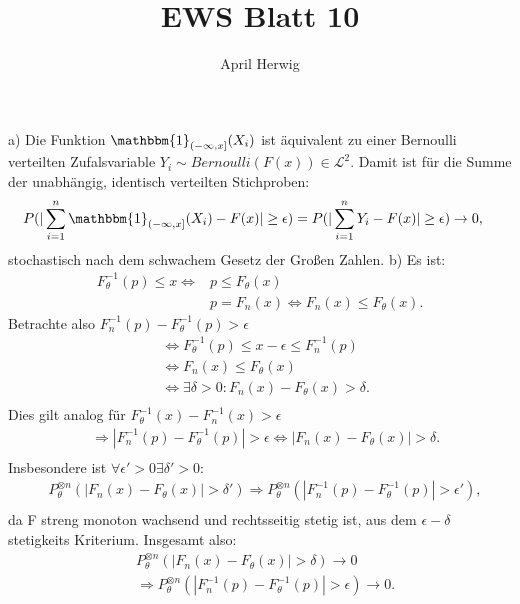 \documentclass[draft]{article}
\title{EWS Blatt 10}
\author{April Herwig}
\begin{document}
\maketitle

a) Die Funktion $\mathbbm{1}_{(-\infty, x]} (X_i)$ ist äquivalent zu einer Bernoulli verteilten Zufalsvariable $Y_i \sim Bernoulli(F(x)) \in \mathcal{L}^2$. Damit ist für die Summe der unabhängig, identisch verteilten Stichproben: 
\begin{align*}
    &P(|\sum\limits_{i=1}^{n}\mathbbm{1}_{(-\infty, x]} (X_i)-F(x)|\geq\epsilon) = P(|\sum\limits_{i=1}^{n} Y_i-F(x)|\geq\epsilon) \rightarrow 0,
\end{align*}
stochastisch nach dem schwachem Gesetz der Großen Zahlen.
\newline
\newline
\newline
b) Es ist: 
\begin{align*}
    F_\theta^{-1}(p) \leq x \Leftrightarrow & p \leq F_\theta(x) \\
    & p = F_n(x) \Leftrightarrow F_n(x) \leq F_\theta(x) .
\end{align*}
Betrachte also $F_n^{-1}(p) - F_\theta^{-1}(p) > \epsilon$
\begin{align*}
    & \Leftrightarrow F_\theta^{-1}(p) \leq x - \epsilon \leq F_n^{-1}(p) \\
    & \Leftrightarrow F_n(x) \leq F_\theta(x) \\
    & \Leftrightarrow \exists \delta > 0 : F_n(x) - F_\theta(x) > \delta . \\
\end{align*}
Dies gilt analog für $F_\theta^{-1}(x) - F_n^{-1}(x) > \epsilon$
\begin{align*}
    & \Rightarrow |F_n^{-1}(p) - F_\theta^{-1}(p)| > \epsilon \Leftrightarrow |F_n(x) - F_\theta(x)| > \delta . \\ 
\end{align*}
Insbesondere ist $\forall\epsilon'>0\exists\delta'>0 :$
\begin{align*}
    & P_\theta^{\otimes n}(|F_n(x) - F_\theta(x)| > \delta') \Rightarrow P_\theta^{\otimes n}(|F_n^{-1}(p) - F_\theta^{-1}(p)| > \epsilon') , \\
\end{align*}
da F streng monoton wachsend und rechtsseitig stetig ist, aus dem $\epsilon - \delta$ \newline
stetigkeits Kriterium. Insgesamt also:
\begin{align*}
    & P_\theta^{\otimes n}(|F_n(x) - F_\theta(x)| > \delta) \rightarrow 0 \\
    & \Rightarrow P_\theta^{\otimes n}(|F_n^{-1}(p) - F_\theta^{-1}(p)| > \epsilon) \rightarrow 0 . \\
\end{align*}
\end{document}

